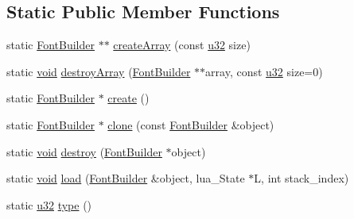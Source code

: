 \subsection*{Static Public Member Functions}
\begin{DoxyCompactItemize}
\item 
static \mbox{\hyperlink{classnjli_1_1_font_builder}{Font\+Builder}} $\ast$$\ast$ \mbox{\hyperlink{classnjli_1_1_font_builder_ab142563549b3f4543eef020bae79aaca}{create\+Array}} (const \mbox{\hyperlink{_util_8h_a10e94b422ef0c20dcdec20d31a1f5049}{u32}} size)
\item 
static \mbox{\hyperlink{_thread_8h_af1e856da2e658414cb2456cb6f7ebc66}{void}} \mbox{\hyperlink{classnjli_1_1_font_builder_ac5727165800adb54029bfe7a6dde6f0e}{destroy\+Array}} (\mbox{\hyperlink{classnjli_1_1_font_builder}{Font\+Builder}} $\ast$$\ast$array, const \mbox{\hyperlink{_util_8h_a10e94b422ef0c20dcdec20d31a1f5049}{u32}} size=0)
\item 
static \mbox{\hyperlink{classnjli_1_1_font_builder}{Font\+Builder}} $\ast$ \mbox{\hyperlink{classnjli_1_1_font_builder_a2a4979dda753397f53fe8bc470f270bf}{create}} ()
\item 
static \mbox{\hyperlink{classnjli_1_1_font_builder}{Font\+Builder}} $\ast$ \mbox{\hyperlink{classnjli_1_1_font_builder_ad940d5ca2cbfbe14e9e5bf562e518572}{clone}} (const \mbox{\hyperlink{classnjli_1_1_font_builder}{Font\+Builder}} \&object)
\item 
static \mbox{\hyperlink{_thread_8h_af1e856da2e658414cb2456cb6f7ebc66}{void}} \mbox{\hyperlink{classnjli_1_1_font_builder_ac202726cfed162ff75c162a4eb3b6201}{destroy}} (\mbox{\hyperlink{classnjli_1_1_font_builder}{Font\+Builder}} $\ast$object)
\item 
static \mbox{\hyperlink{_thread_8h_af1e856da2e658414cb2456cb6f7ebc66}{void}} \mbox{\hyperlink{classnjli_1_1_font_builder_a738437839223d7fa03269557753e8513}{load}} (\mbox{\hyperlink{classnjli_1_1_font_builder}{Font\+Builder}} \&object, lua\+\_\+\+State $\ast$L, int stack\+\_\+index)
\item 
static \mbox{\hyperlink{_util_8h_a10e94b422ef0c20dcdec20d31a1f5049}{u32}} \mbox{\hyperlink{classnjli_1_1_font_builder_a4385a3b8e3ca2e1d42422221692c461a}{type}} ()
\end{DoxyCompactItemize}
